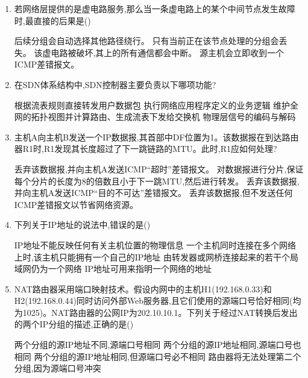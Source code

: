 \documentclass[12pt, a4paper, oneside, UTF8]{ctexbook}
\begin{document}
\begin{enumerate}
    \item 若网络层提供的是虚电路服务,那么当一条虚电路上的某个中间节点发生故障时,最直接的后果是(\qquad)
    \begin{choices}[1]
    \task 后续分组会自动选择其他路径绕行。
    \task 只有当前正在该节点处理的分组会丢失。
    \task 该虚电路被破坏,其上的所有通信都会中断。
    \task 源主机会立即收到一个ICMP差错报文。
    \end{choices}

    \item 在SDN体系结构中,SDN控制器主要负责以下哪项功能?
    \begin{choices}[1]
    \task 根据流表规则直接转发用户数据包
    \task 执行网络应用程序定义的业务逻辑
    \task 维护全网的拓扑视图并计算路由、生成流表下发给交换机
    \task 物理层信号的编码与解码
    \end{choices}

    \item 主机A向主机B发送一个IP数据报,其首部中DF位置为1。该数据报在到达路由器R1时,R1发现其长度超过了下一跳链路的MTU。此时,R1应如何处理?
    \begin{choices}[1]
    \task 丢弃该数据报,并向主机A发送ICMP“超时”差错报文。
    \task 对数据报进行分片,保证每个分片的长度为8的倍数且小于下一跳MTU,然后进行转发。
    \task 丢弃该数据报,并向主机A发送ICMP“目的不可达”差错报文。
    \task 丢弃该数据报,但不发送任何ICMP差错报文以节省网络资源。
    \end{choices}

    \item 下列关于IP地址的说法中,错误的是(\qquad)
    \begin{choices}[1]
    \task IP地址不能反映任何有关主机位置的物理信息
    \task 一个主机同时连接在多个网络上时,该主机只能拥有一个自己的IP地址
    \task 由转发器或网桥连接起来的若干个局域网仍为一个网络
    \task IP地址可用来指明一个网络的地址
    \end{choices}

    \item NAT路由器采用端口映射技术。假设内网中的主机H1(192.168.0.33)和H2(192.168.0.44)同时访问外部Web服务器,且它们使用的源端口号恰好相同(均为1025)。NAT路由器的公网IP为202.10.10.1。下列关于经过NAT转换后发出的两个IP分组的描述,正确的是(\qquad)
    \begin{choices}[1]
    \task 两个分组的源IP地址不同,源端口号相同
    \task 两个分组的源IP地址相同,源端口号也相同
    \task 两个分组的源IP地址相同,但源端口号必不相同
    \task 路由器将无法处理第二个分组,因为源端口号冲突
    \end{choices}


\end{enumerate}
\end{document}
